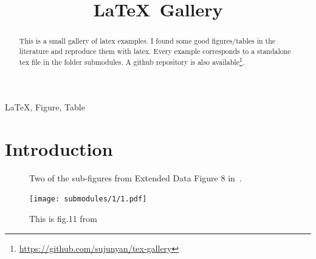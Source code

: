 \documentclass[conference]{IEEEtran}
\title{\LaTeX\, Gallery}
\author{
    \IEEEauthorblockN{Junyan Su}
    \IEEEauthorblockA{junyan.su@my.cityu.edu.hk}
}
\begin{document}
\maketitle

\begin{abstract}
    This is a small gallery of latex examples. I found some good figures/tables in the literature and reproduce them with latex. Every example corresponds to a standalone tex file in the folder submodules. A github repository is also available\footnote{\url{https://github.com/sujunyan/tex-gallery}}.
\end{abstract}


\begin{IEEEkeywords}
    \LaTeX , Figure, Table
\end{IEEEkeywords}

\section{Introduction}
\lipsum[1]
\begin{figure}[tb]
    \begin{center}
    \end{center} 
    \caption{Two of the sub-figures from Extended Data Figure 8 in~\cite{2}.}
\end{figure}

\lipsum[1]
\begin{figure}[htb]
    \begin{center}
        \texttt{[image: submodules/1/1.pdf]}
    \end{center} 
    \caption{This is fig.11 from~\cite{1}}
\end{figure}
\end{document}

